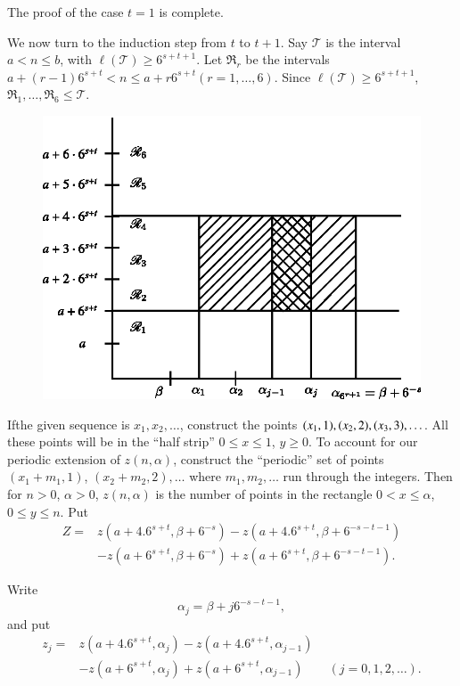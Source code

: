 The proof of the case $t = 1$ is complete.

We now turn to the induction step from $t$ to $t+1$. Say $\mathscr{T}$ is the interval $a < n \leq b$, with $\ell (\mathscr{T}) \geq 6^{s+t+1}$. Let $\mathfrak{R}_{r}$ be the intervals $a + (r-1)6^{s+t} < n \leq a + r 6^{s+t} (r = 1, \ldots, 6)$. Since $\ell (\mathscr{T}) \geq 6^{s+t+1}$, $\mathfrak{R}_{1}, \ldots, \mathfrak{R}_{6} \leq \mathscr{T}$.

\begin{figure}[H]
\centering
\includegraphics{fig2.eps}
\end{figure}

If\pageoriginale the given sequence is $x_{1}, x_{2}, \ldots$,
construct the points $(x_{1}, 1),\break (x_{2}, 2), (x_{3}, 3), \ldots$. All
these points will be in the ``half strip'' $0 \leq x \leq 1$, $y \geq
0$. To account for our periodic extension of $z(n, \alpha)$, construct
the ``periodic'' set of points $(x_{1} + m_{1}, 1)$, $(x_{2} + m_{2},
2), \ldots$ where $m_{1}, m_{2}, \ldots$ run through the
integers. Then for $n > 0$, $\alpha > 0$, $z(n, \alpha)$ is the number
of points in the rectangle $0 < x \leq \alpha$, $0 \leq y \leq n$. Put 
\begin{align*}
Z = & z(a + 4.6^{s+t}, \beta + 6^{-s}) -z(a + 4.6^{s+t}, \beta + 6^{-s-t-1})\\
& - z(a + 6^{s+t}, \beta + 6^{-s}) + z(a + 6^{s+t}, \beta + 6^{-s-t-1}).
\end{align*}

Write
$$
\alpha_{j} = \beta + j 6^{-s-t-1},
$$
and put
\begin{align*}
z_{j} = & z(a + 4.6^{s+t}, \alpha_{j}) - z(a + 4.6^{s+t}, \alpha_{j-1})\\
 & - z(a + 6^{s+t}, \alpha_{j}) + z(a + 6^{s+t}, \alpha_{j-1}) \qquad (j = 0, 1, 2, \ldots).
\end{align*}

